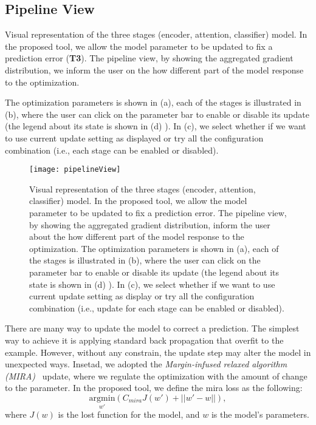\subsection{Pipeline View}
\label{sec:pipeline}
Visual representation of the three stages (encoder, attention, classifier) model. In the proposed tool, we allow the model parameter to be updated to fix a prediction error (\textbf{T3}). The pipeline view, by showing the aggregated gradient distribution, we inform the user on the how different part of the model response to the optimization.

The optimization parameters is shown in (a), each of the stages is illustrated in (b), where the user can click on the parameter bar to enable or disable its update (the legend about its state is shown in (d) ). In (c), we select whether if we want to use current update setting as displayed or try all the configuration combination (i.e., each stage can be enabled or disabled).

\begin{figure}[htbp]
\centering
\vspace{-2mm}
 \texttt{[image: pipelineView]}
 \caption{
Visual representation of the three stages (encoder, attention, classifier) model. In the proposed tool, we allow the model parameter to be updated to fix a prediction error. The pipeline view, by showing the aggregated gradient distribution, inform the user about the how different part of the model response to the optimization.
%
The optimization parameters is shown in (a), each of the stages is illustrated in (b), where the user can click on the parameter bar to enable or disable its update (the legend about its state is shown in (d) ). In (c), we select whether if we want to use current update setting as display or try all the configuration combination (i.e., update for each stage can be enabled or disabled).
 }
\label{fig:pipelineView}
\end{figure}

There are many way to update the model to correct a prediction. The simplest way to achieve it is applying standard back propagation that overfit to the example. However, without any constrain, the update step may alter the model in unexpected ways. 
Insetad, we adopted the \emph{Margin-infused relaxed algorithm (MIRA)}~\cite{CrammerSinger2003} update, where we regulate the optimization with the amount of change to the parameter. In the proposed tool, we define the mira loss as the following:
\begin{equation}
\underset{w'}{\mathrm{argmin}}( C_{mira} J(w') + ||w' - w||),
\end{equation}
where $J(w)$ is the lost function for the model, and $w$ is the model's parameters.
